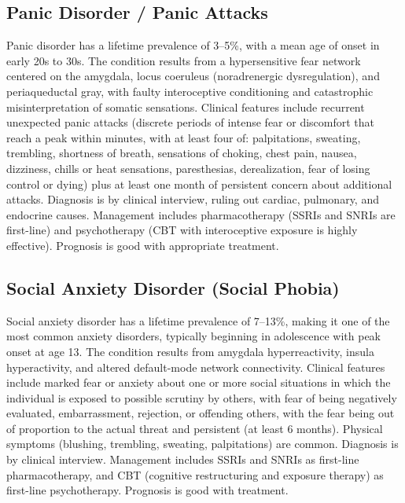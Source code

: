 \subsection{Panic Disorder / Panic Attacks}
\label{sec:Panic Disorder / Panic Attacks}
Panic disorder has a lifetime prevalence of 3--5\%, with a mean age of onset in early 20s to 30s. The condition results from a hypersensitive fear network centered on the amygdala, locus coeruleus (noradrenergic dysregulation), and periaqueductal gray, with faulty interoceptive conditioning and catastrophic misinterpretation of somatic sensations. Clinical features include recurrent unexpected panic attacks (discrete periods of intense fear or discomfort that reach a peak within minutes, with at least four of: palpitations, sweating, trembling, shortness of breath, sensations of choking, chest pain, nausea, dizziness, chills or heat sensations, paresthesias, derealization, fear of losing control or dying) plus at least one month of persistent concern about additional attacks. Diagnosis is by clinical interview, ruling out cardiac, pulmonary, and endocrine causes. Management includes pharmacotherapy (SSRIs and SNRIs are first-line) and psychotherapy (CBT with interoceptive exposure is highly effective). Prognosis is good with appropriate treatment.

\subsection{Social Anxiety Disorder (Social Phobia)}
\label{sec:Social Anxiety Disorder (Social Phobia)}
Social anxiety disorder has a lifetime prevalence of 7--13\%, making it one of the most common anxiety disorders, typically beginning in adolescence with peak onset at age 13. The condition results from amygdala hyperreactivity, insula hyperactivity, and altered default-mode network connectivity. Clinical features include marked fear or anxiety about one or more social situations in which the individual is exposed to possible scrutiny by others, with fear of being negatively evaluated, embarrassment, rejection, or offending others, with the fear being out of proportion to the actual threat and persistent (at least 6 months). Physical symptoms (blushing, trembling, sweating, palpitations) are common. Diagnosis is by clinical interview. Management includes SSRIs and SNRIs as first-line pharmacotherapy, and CBT (cognitive restructuring and exposure therapy) as first-line psychotherapy. Prognosis is good with treatment.


